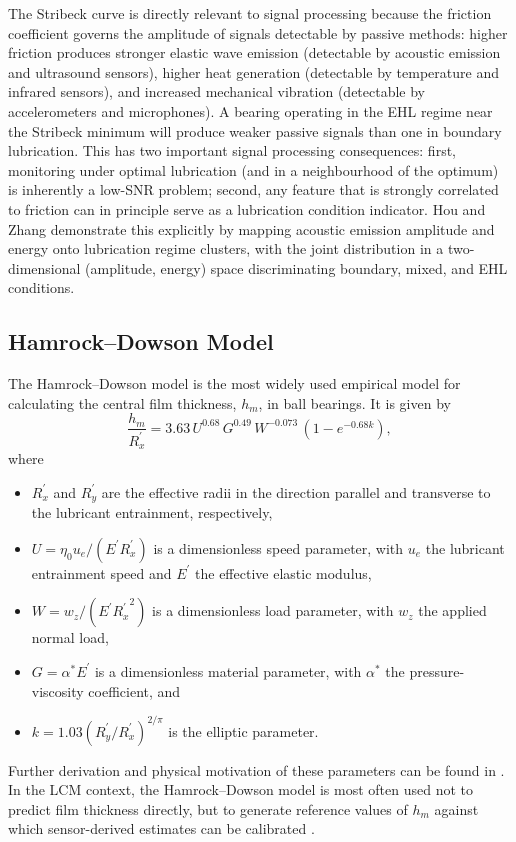 The Stribeck curve is directly relevant to signal processing because the friction coefficient governs the amplitude of signals detectable by passive methods: higher friction produces stronger elastic wave emission (detectable by acoustic emission and ultrasound sensors), higher heat generation (detectable by temperature and infrared sensors), and increased mechanical vibration (detectable by accelerometers and microphones). A bearing operating in the EHL regime near the Stribeck minimum will produce weaker passive signals than one in boundary lubrication. This has two important signal processing consequences: first, monitoring under optimal lubrication (and in a neighbourhood of the optimum) is inherently a low-SNR problem; second, any feature that is strongly correlated to friction can in principle serve as a lubrication condition indicator. Hou and Zhang \cite{hou_-situ_2025} demonstrate this explicitly by mapping acoustic emission amplitude and energy onto lubrication regime clusters, with the joint distribution in a two-dimensional (amplitude, energy) space discriminating boundary, mixed, and EHL conditions.

\subsection{Hamrock--Dowson Model}
\label{subsec:hamrock_dowson}
The Hamrock--Dowson model is the most widely used empirical model for calculating the central film thickness, $h_m$, in ball bearings. It is given by
\begin{equation}
    \frac{h_m}{R_{x}^{'}} = 3.63\,U^{0.68}\,G^{0.49}\,W^{-0.073}\,(1-e^{-0.68k}),
\end{equation}
where
\begin{itemize}
    \item $R^{'}_{x}$ and $R^{'}_{y}$ are the effective radii in the direction parallel and transverse to the lubricant entrainment, respectively,
    \item $U=\eta_0 u_e/(E^{'}R^{'}_{x})$ is a dimensionless speed parameter, with $u_e$ the lubricant entrainment speed and $E^{'}$ the effective elastic modulus,
    \item $W=w_z/(E^{'}{R^{'}_{x}}^{2})$ is a dimensionless load parameter, with $w_z$ the applied normal load,
    \item $G=\alpha^*E^{'}$ is a dimensionless material parameter, with $\alpha^*$ the pressure-viscosity coefficient, and
    \item $k=1.03(R_{y}^{'}/R_{x}^{'})^{2/\pi}$ is the elliptic parameter.
\end{itemize}
Further derivation and physical motivation of these parameters can be found in \cite{cen_ehl_2021,hansen_new_2021,maruyama_lubrication_2019,noauthor_elasto-hydrodynamic_1977}. In the LCM context, the Hamrock--Dowson model is most often used not to predict film thickness directly, but to generate reference values of $h_m$ against which sensor-derived estimates can be calibrated \cite{jakobsen_detecting_2023,hou_-situ_2025,jablonka_quantitative_2018}.

